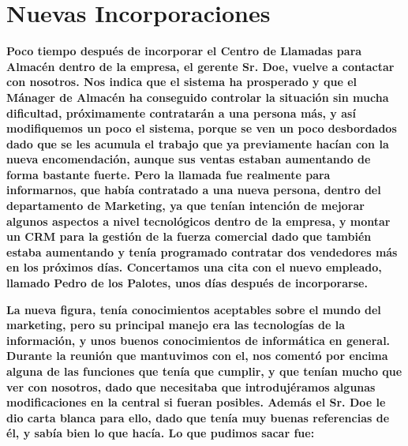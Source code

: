 
\section{Nuevas Incorporaciones}

\textbf{Poco tiempo después de incorporar el Centro de Llamadas para Almacén dentro de la empresa, el gerente Sr. Doe, vuelve a contactar con nosotros. Nos indica que el sistema ha prosperado y que el Mánager de Almacén ha conseguido controlar la situación sin mucha dificultad, próximamente contratarán a una persona más, y así modifiquemos un poco el sistema, porque se ven un poco desbordados dado que se les acumula el trabajo que ya previamente hacían con la nueva encomendación, aunque sus ventas estaban aumentando de forma bastante fuerte. Pero la llamada fue realmente para informarnos, que había contratado a una nueva persona, dentro del departamento de Marketing, ya que tenían intención de mejorar algunos aspectos a nivel tecnológicos dentro de la empresa, y montar un CRM para la gestión de la fuerza comercial dado que también estaba aumentando y tenía programado contratar dos vendedores más en los próximos días. Concertamos una cita con el nuevo empleado, llamado Pedro de los Palotes, unos días después de incorporarse.}

\textbf{La nueva figura, tenía conocimientos aceptables sobre el mundo del marketing, pero su principal manejo era las tecnologías de la información, y unos buenos conocimientos de informática en general. Durante la reunión que mantuvimos con el, nos comentó por encima alguna de las funciones que tenía que cumplir, y que tenían mucho que ver con nosotros, dado que necesitaba que introdujéramos algunas modificaciones en la central si fueran posibles. Además el Sr. Doe le dio carta blanca para ello, dado que tenía muy buenas referencias de él, y sabía bien lo que hacía. Lo que pudimos sacar fue:}

